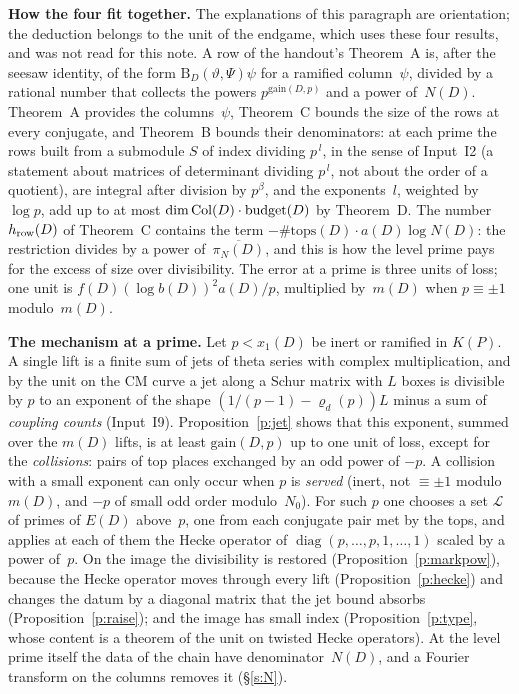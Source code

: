 \documentclass[11pt,a4paper]{article}
\newcommand{\diag}{\operatorname{diag}}
\theoremstyle{plainx}
\theoremstyle{uprightx}
\newcommand{\cj}[1]{\overline{#1}}
\newcommand{\KP}[1]{K(#1)}
\newcommand{\ED}[1]{E(#1)}
\newcommand{\xoD}[1]{x_1(#1)}
\newcommand{\bD}[1]{b(#1)}
\newcommand{\mD}[1]{m(#1)}
\newcommand{\fD}[1]{f(#1)}
\newcommand{\aD}[1]{a(#1)}
\newcommand{\tops}[1]{\mathrm{tops}(#1)}
\newcommand{\bud}[1]{\mathrm{budget}(#1)}
\newcommand{\ND}[1]{N(#1)}
\newcommand{\piN}[1]{\pi_N(#1)}
\newcommand{\gain}[2]{\mathrm{gain}(#1,#2)}
\newcommand{\nsw}[2]{\varrho_{#1}(#2)}
\newcommand{\Bch}[3]{\mathrm{B}_{#1}(#2,#3)}
\begin{document}
\textbf{How the four fit together.} The explanations of this paragraph are orientation; the deduction belongs to
the unit of the endgame, which uses these four results, and was not read for this note. A row of the handout's Theorem~A is,
after the seesaw identity, of the form $\Bch{D}{\vartheta}{\Psi}\psi$ for a ramified column~$\psi$, divided by a
rational number that collects the powers $p^{\gain{D}{p}}$ and a power of~$\ND{D}$. Theorem~A provides the
columns~$\psi$, Theorem~C bounds the size of the rows at every conjugate, and Theorem~B bounds their
denominators: at each prime the rows built from a submodule $S$ of index dividing $p^{\,l}$, in the sense of Input~I2 (a
statement about matrices of determinant dividing $p^{\,l}$, not about the order of a quotient), are integral
after division by $p^{\beta}$, and the exponents~$l$, weighted by $\log p$, add up to at most
$\dim\Col{D}\cdot\bud{D}$ by Theorem~D. The number $h_{\mathrm{row}}(D)$ of Theorem~C contains the term
$-\#\tops{D}\cdot\aD{D}\log\ND{D}$: the restriction divides by a power of~$\cj{\piN{D}}$, and this is how the
level prime pays for the excess of size over divisibility. The error at a prime is three units of loss; one unit
is $\fD{D}(\log \bD{D})^2\aD{D}/p$, multiplied by~$\mD{D}$ when $p\equiv\pm1$ modulo~$\mD{D}$.

\textbf{The mechanism at a prime.} Let $p<\xoD{D}$ be inert or ramified in $\KP{P}$. A single lift is a finite sum of
jets of theta series with complex multiplication, and by the unit on the CM curve a jet along a Schur matrix with
$L$ boxes is divisible by $p$ to an exponent of the shape $(1/(p-1)-\nsw{d}{p})L$ minus a sum of
\emph{coupling counts} (Input~I9). Proposition~\ref{p:jet} shows that this exponent, summed over the $\mD{D}$ lifts,
is at least $\gain{D}{p}$ up to one unit of loss, except for the \emph{collisions}: pairs of top places exchanged
by an odd power of $-p$. A collision with a small exponent can only occur when $p$ is \emph{served}
(inert, not $\equiv\pm1$ modulo~$\mD{D}$, and $-p$ of small odd order modulo~$N_0$). For such $p$ one chooses a set
$\mathcal{L}$ of primes of $\ED{D}$ above~$p$, one from each conjugate pair met by the tops, and applies at each
of them the Hecke operator of $\diag(p,\dots,p,1,\dots,1)$ scaled by a power of~$p$. On the image the
divisibility is restored (Proposition~\ref{p:markpow}), because the Hecke operator moves through every lift
(Proposition~\ref{p:hecke}) and changes the datum by a diagonal matrix that the jet bound absorbs
(Proposition~\ref{p:raise}); and the image has small index (Proposition~\ref{p:type}, whose content is a theorem
of the unit on twisted Hecke operators). At the level prime itself the data of the chain have denominator~$\ND{D}$,
and a Fourier transform on the columns removes it (§\ref{s:N}).
\end{document}
